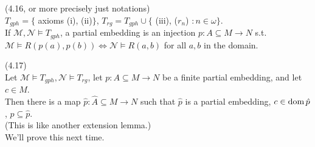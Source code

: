 \documentclass[a4paper]{article}
\begin{document}
\begin{defi} (4.16, or more precisely just notations)\\
    $T_{gph} = \{$ axioms (i), (ii)$\}$, $T_{rg} = T_{gph} \cup \{$ (iii), ($r_n$) $:n \in \omega\}$.\\
    If $\mathcal{M},\mathcal{N} \vDash T_{gph}$, a partial embedding is an injection $p: A \subseteq M \to N$ s.t. $\mathcal{M} \vDash R(p(a),p(b)) \iff \mathcal{N} \vDash R(a,b)$ for all $a,b$ in the domain.
\end{defi}

\begin{lemma} (4.17)\\
    Let $\mathcal{M} \vDash T_{gph},\mathcal{N} \vDash T_{rg}$, let $p:A \subseteq M \to N$ be a finite partial embedding, and let $c \in M$.\\
    Then there is a map $\hat{p}:\hat{A} \subseteq M \to N$ such that $\hat{p}$ is a partial embedding, $c \in \operatorname{dom} \hat{p}$, $p\subseteq \hat{p}$.\\
    (This is like another extension lemma.)\\
    We'll prove this next time.
\end{lemma}
\end{document}
